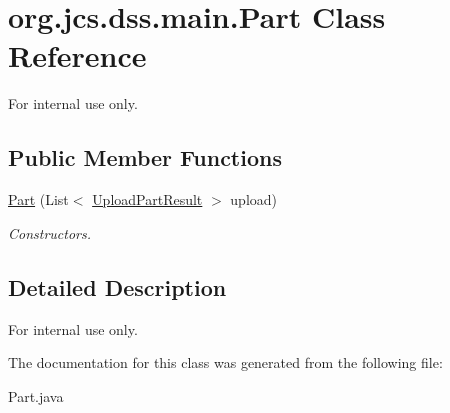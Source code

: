 \hypertarget{classorg_1_1jcs_1_1dss_1_1main_1_1Part}{}\section{org.\+jcs.\+dss.\+main.\+Part Class Reference}
\label{classorg_1_1jcs_1_1dss_1_1main_1_1Part}


For internal use only.  


\subsection*{Public Member Functions}
\begin{DoxyCompactItemize}
\item 
\hyperlink{classorg_1_1jcs_1_1dss_1_1main_1_1Part_a286f3070cfa7e68069a4cb8beead0fe1}{Part} (List$<$ \hyperlink{classorg_1_1jcs_1_1dss_1_1main_1_1UploadPartResult}{Upload\+Part\+Result} $>$ upload)\hypertarget{classorg_1_1jcs_1_1dss_1_1main_1_1Part_a286f3070cfa7e68069a4cb8beead0fe1}{}\label{classorg_1_1jcs_1_1dss_1_1main_1_1Part_a286f3070cfa7e68069a4cb8beead0fe1}

\begin{DoxyCompactList}\small\item\em Constructors. \end{DoxyCompactList}\end{DoxyCompactItemize}


\subsection{Detailed Description}
For internal use only. 

The documentation for this class was generated from the following file\+:\begin{DoxyCompactItemize}
\item 
Part.\+java\end{DoxyCompactItemize}
